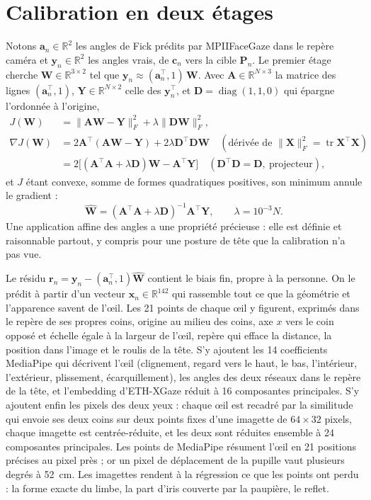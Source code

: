 \documentclass[10pt,a4paper]{article}
\newcommand{\R}{\mathbb{R}}
\newcommand{\vect}[1]{\symbf{#1}}
\newcommand{\T}{^{\top}}
\begin{document}
\section{Calibration en deux étages}\label{sec:cal}

Notons $\vect a_n\in\R^2$ les angles de Fick prédits par MPIIFaceGaze dans le repère caméra et $\vect y_n\in\R^2$ les angles vrais, de $\vect c_n$ vers la cible $\vect P_n$. Le premier étage cherche $\mathbf W\in\R^{3\times2}$ tel que $\vect y_n\approx(\vect a_n\T,1)\,\mathbf W$. Avec $\mathbf A\in\R^{N\times3}$ la matrice des lignes $(\vect a_n\T,1)$, $\mathbf Y\in\R^{N\times2}$ celle des $\vect y_n\T$, et $\mathbf D=\operatorname{diag}(1,1,0)$ qui épargne l'ordonnée à l'origine,
\begin{align}
J(\mathbf W)&=\|\mathbf A\mathbf W-\mathbf Y\|_F^2+\lambda\|\mathbf D\mathbf W\|_F^2,\\
\nabla J(\mathbf W)&=2\mathbf A\T(\mathbf A\mathbf W-\mathbf Y)+2\lambda\mathbf D\T\mathbf D\mathbf W
\quad(\text{dérivée de }\|\mathbf X\|_F^2=\operatorname{tr}\mathbf X\T\mathbf X)\\
&=2\bigl[(\mathbf A\T\mathbf A+\lambda\mathbf D)\mathbf W-\mathbf A\T\mathbf Y\bigr]\quad(\mathbf D\T\mathbf D=\mathbf D,\ \text{projecteur}),
\end{align}
et $J$ étant convexe, somme de formes quadratiques positives, son minimum annule le gradient :
\begin{equation}
\hat{\mathbf W}=(\mathbf A\T\mathbf A+\lambda\mathbf D)^{-1}\mathbf A\T\mathbf Y,\qquad\lambda=10^{-3}N .
\end{equation}
Une application affine des angles a une propriété précieuse : elle est définie et raisonnable partout, y compris pour une posture de tête que la calibration n'a pas vue.

Le résidu $\vect r_n=\vect y_n-(\vect a_n\T,1)\hat{\mathbf W}$ contient le biais fin, propre à la personne. On le prédit à partir d'un vecteur $\vect x_n\in\R^{142}$ qui rassemble tout ce que la géométrie et l'apparence savent de l'œil. Les 21 points de chaque œil y figurent, exprimés dans le repère de ses propres coins, origine au milieu des coins, axe $x$ vers le coin opposé et échelle égale à la largeur de l'œil, repère qui efface la distance, la position dans l'image et le roulis de la tête. S'y ajoutent les 14 coefficients MediaPipe qui décrivent l'œil (clignement, regard vers le haut, le bas, l'intérieur, l'extérieur, plissement, écarquillement), les angles des deux réseaux dans le repère de la tête, et l'embedding d'ETH-XGaze réduit à 16 composantes principales. S'y ajoutent enfin les pixels des deux yeux : chaque œil est recadré par la similitude qui envoie ses deux coins sur deux points fixes d'une imagette de $64\times32$ pixels, chaque imagette est centrée-réduite, et les deux sont réduites ensemble à 24 composantes principales. Les points de MediaPipe résument l'œil en 21 positions précises au pixel près ; or un pixel de déplacement de la pupille vaut plusieurs degrés à 52~cm. Les imagettes rendent à la régression ce que les points ont perdu : la forme exacte du limbe, la part d'iris couverte par la paupière, le reflet.
\end{document}
